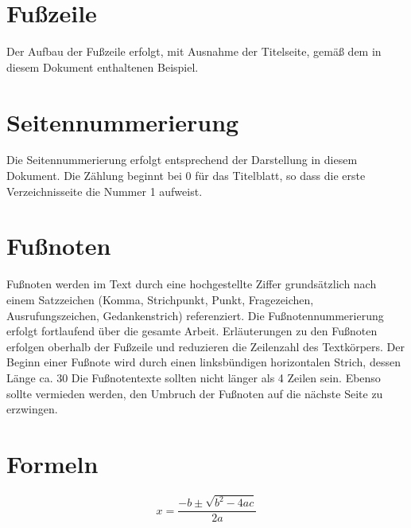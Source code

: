 \section{Fußzeile}
Der Aufbau der Fußzeile erfolgt, mit Ausnahme der Titelseite, gemäß dem in diesem Dokument enthaltenen Beispiel.

\section{Seitennummerierung}
Die Seitennummerierung erfolgt entsprechend der Darstellung in diesem Dokument. Die Zählung beginnt bei 0 für das Titelblatt, so dass die erste Verzeichnisseite die Nummer 1 aufweist.

\section{Fußnoten}
Fußnoten werden im Text durch eine hochgestellte Ziffer grundsätzlich nach einem Satzzeichen (Komma, Strichpunkt, Punkt, Fragezeichen, Ausrufungszeichen, Gedankenstrich) referenziert. Die Fußnotennummerierung erfolgt fortlaufend über die gesamte Arbeit.
Erläuterungen zu den Fußnoten erfolgen oberhalb der Fußzeile und reduzieren die Zeilenzahl des Textkörpers. Der Beginn einer Fußnote wird durch einen linksbündigen horizontalen Strich, dessen Länge ca. 30%
Die Fußnotentexte sollten nicht länger als 4 Zeilen sein. Ebenso sollte vermieden werden, den Umbruch der Fußnoten auf die nächste Seite zu erzwingen.

\section{Formeln}

\begin{equation}
	x = \frac{-b \pm \sqrt{b^2 - 4ac}}{2a}
\end{equation}
